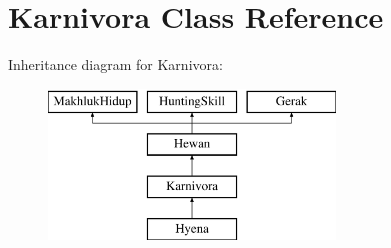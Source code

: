 \hypertarget{class_karnivora}{}\section{Karnivora Class Reference}
\label{class_karnivora}
Inheritance diagram for Karnivora\+:\begin{figure}[H]
\begin{center}
\leavevmode
\includegraphics[height=4.000000cm]{class_karnivora}
\end{center}
\end{figure}
